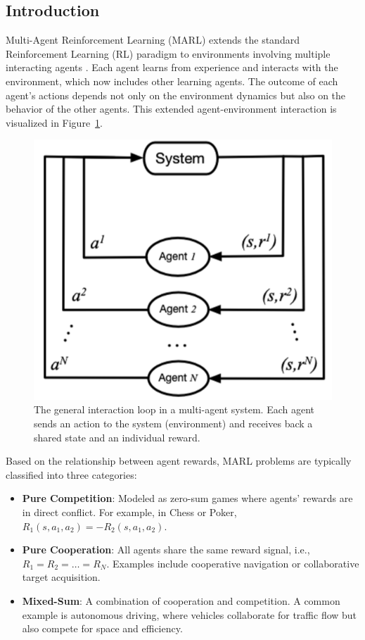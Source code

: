 \documentclass[../Main.tex]{subfiles}
\begin{document}
\subsection{Introduction}

Multi-Agent Reinforcement Learning (MARL) extends the standard Reinforcement Learning (RL) paradigm to environments involving multiple interacting agents \cite{busoniu2008comprehensive}. Each agent learns from experience and interacts with the environment, which now includes other learning agents. The outcome of each agent’s actions depends not only on the environment dynamics but also on the behavior of the other agents. This extended agent-environment interaction is visualized in Figure~\ref{fig:marl_interaction_loop}.


\begin{figure}[H]
    \centering
    \includegraphics[width=0.5\linewidth]{marl-framework.png}
    \caption{The general interaction loop in a multi-agent system. Each agent sends an action to the system (environment) and receives back a shared state and an individual reward.}
    \label{fig:marl_interaction_loop}
\end{figure}

Based on the relationship between agent rewards, MARL problems are typically classified into three categories:
\begin{itemize}
    \item \textbf{Pure Competition}: Modeled as zero-sum games where agents' rewards are in direct conflict. For example, in Chess or Poker, \( R_1(s, a_1, a_2) = - R_2(s, a_1, a_2) \).
    \item \textbf{Pure Cooperation}: All agents share the same reward signal, i.e., \( R_1 = R_2 = \dots = R_N \). Examples include cooperative navigation or collaborative target acquisition.
    \item \textbf{Mixed-Sum}: A combination of cooperation and competition. A common example is autonomous driving, where vehicles collaborate for traffic flow but also compete for space and efficiency.
\end{itemize}
\end{document}
